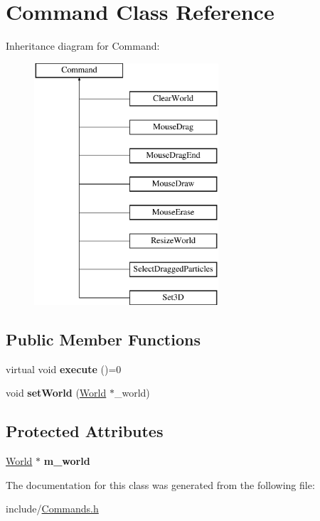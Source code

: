 \hypertarget{classCommand}{\section{Command Class Reference}
\label{classCommand}
}
Inheritance diagram for Command\-:\begin{figure}[H]
\begin{center}
\leavevmode
\includegraphics[height=9.000000cm]{classCommand}
\end{center}
\end{figure}
\subsection*{Public Member Functions}
\begin{DoxyCompactItemize}
\item 
\hypertarget{classCommand_a6fd7d9bd8df8bfc881e4d6c7cd1878b7}{virtual void {\bfseries execute} ()=0}\label{classCommand_a6fd7d9bd8df8bfc881e4d6c7cd1878b7}

\item 
\hypertarget{classCommand_aca6e0ee5ee282b6e751e615cc6d42c44}{void {\bfseries set\-World} (\hyperlink{classWorld}{World} $\ast$\-\_\-world)}\label{classCommand_aca6e0ee5ee282b6e751e615cc6d42c44}

\end{DoxyCompactItemize}
\subsection*{Protected Attributes}
\begin{DoxyCompactItemize}
\item 
\hypertarget{classCommand_af7d2460e597be6d61005521563d974b5}{\hyperlink{classWorld}{World} $\ast$ {\bfseries m\-\_\-world}}\label{classCommand_af7d2460e597be6d61005521563d974b5}

\end{DoxyCompactItemize}


The documentation for this class was generated from the following file\-:\begin{DoxyCompactItemize}
\item 
include/\hyperlink{Commands_8h}{Commands.\-h}\end{DoxyCompactItemize}
